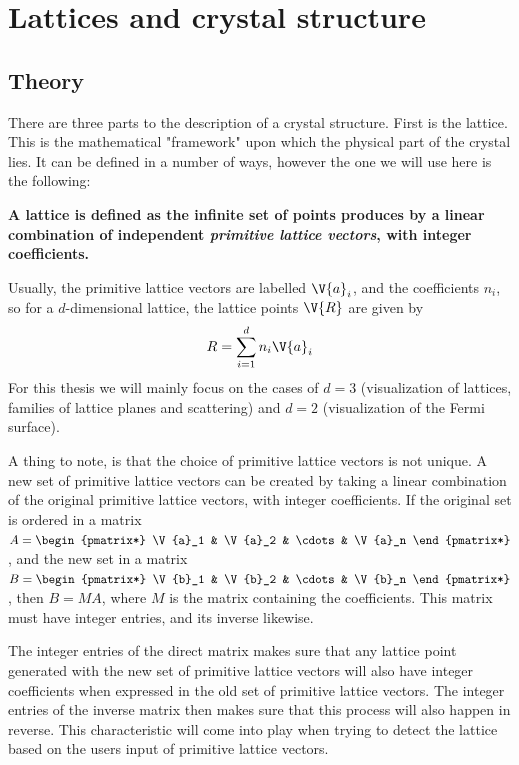 \documentclass[main.tex]{subfiles}
\begin{document}
	\section{Lattices and crystal structure}
	\subsection{Theory} \label{sec:lattice_theory}
	There are three parts to the description of a crystal structure. First is the lattice. This is the mathematical "framework" upon which the physical part of the crystal lies. It can be defined in a number of ways, however the one we will use here is the following:
	
	\textbf{A lattice is defined as the infinite set of points produces by a linear combination of independent \emph{primitive lattice vectors}, with integer coefficients.}
	
	Usually, the primitive lattice vectors are labelled $ \V{a}_i $, and the coefficients $ n_i $, so for a $ d $-dimensional lattice, the lattice points $ \V{R} $ are given by
	\begin{equation}\label{eq:lattice_points}
	R = \sum_{i = 1}^{d} n_i \V{a}_i
	\end{equation}
	For this thesis we will mainly focus on the cases of $ d = 3 $ (visualization of lattices, families of lattice planes and scattering) and $ d = 2 $ (visualization of the Fermi surface).
	
	A thing to note, is that the choice of primitive lattice vectors is not unique. A new set of primitive lattice vectors can be created by taking a linear combination of the original primitive lattice vectors, with integer coefficients. If the original set is ordered in a matrix $ A = \begin{pmatrix*} \V{a}_1 & \V{a}_2 & \cdots & \V{a}_n \end{pmatrix*}$, and the new set in a matrix $ B = \begin{pmatrix*} \V{b}_1 & \V{b}_2 & \cdots & \V{b}_n \end{pmatrix*} $, then $ B = MA $, where $ M $ is the matrix containing the coefficients. This matrix must have integer entries, and its inverse likewise.
	
	The integer entries of the direct matrix makes sure that any lattice point generated with the new set of primitive lattice vectors will also have integer coefficients when expressed in the old set of primitive lattice vectors. The integer entries of the inverse matrix then makes sure that this process will also happen in reverse. This characteristic will come into play when trying to detect the lattice based on the users input of primitive lattice vectors.
	
\end{document}
